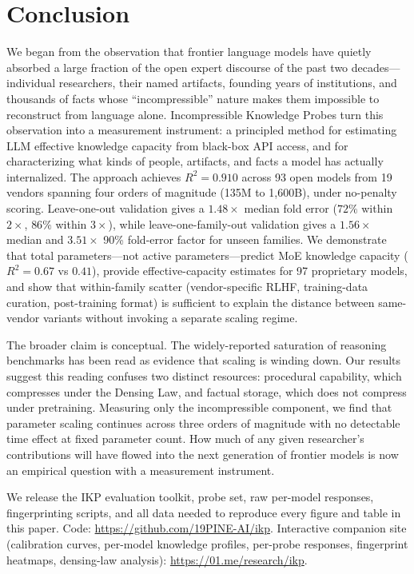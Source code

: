 \documentclass[11pt]{article}
\begin{document}
\section{Conclusion}
\label{sec:conclusion}

We began from the observation that frontier language models have quietly absorbed a large fraction of the open expert discourse of the past two decades---individual researchers, their named artifacts, founding years of institutions, and thousands of facts whose ``incompressible'' nature makes them impossible to reconstruct from language alone. Incompressible Knowledge Probes turn this observation into a measurement instrument: a principled method for estimating LLM effective knowledge capacity from black-box API access, and for characterizing what kinds of people, artifacts, and facts a model has actually internalized. The approach achieves $R^2 = 0.910$ across 93 open models from 19 vendors spanning four orders of magnitude (135M to 1{,}600B), under no-penalty scoring. Leave-one-out validation gives a $1.48\times$ median fold error ($72\%$ within $2\times$, $86\%$ within $3\times$), while leave-one-family-out validation gives a $1.56\times$ median and $3.51\times$ 90\% fold-error factor for unseen families. We demonstrate that total parameters---not active parameters---predict MoE knowledge capacity ($R^2 = 0.67$ vs $0.41$), provide effective-capacity estimates for 97 proprietary models, and show that within-family scatter (vendor-specific RLHF, training-data curation, post-training format) is sufficient to explain the distance between same-vendor variants without invoking a separate scaling regime.

The broader claim is conceptual. The widely-reported saturation of reasoning benchmarks has been read as evidence that scaling is winding down. Our results suggest this reading confuses two distinct resources: procedural capability, which compresses under the Densing Law, and factual storage, which does not compress under pretraining. Measuring only the incompressible component, we find that parameter scaling continues across three orders of magnitude with no detectable time effect at fixed parameter count. How much of any given researcher's contributions will have flowed into the next generation of frontier models is now an empirical question with a measurement instrument.

We release the IKP evaluation toolkit, probe set, raw per-model responses, fingerprinting scripts, and all data needed to reproduce every figure and table in this paper. Code: \url{https://github.com/19PINE-AI/ikp}. Interactive companion site (calibration curves, per-model knowledge profiles, per-probe responses, fingerprint heatmaps, densing-law analysis): \url{https://01.me/research/ikp}.
\end{document}
